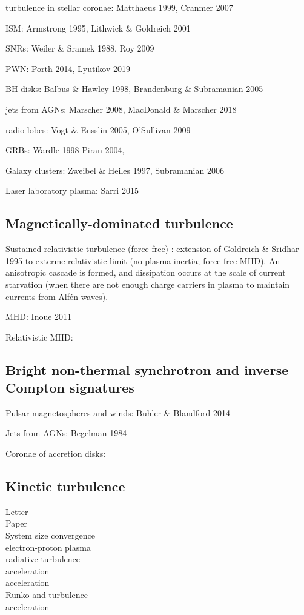 \documentclass[usenatbib,twocolumn]{aastex63}
\begin{document}
turbulence in stellar coronae:
Matthaeus 1999, Cranmer 2007

ISM:
Armstrong 1995, Lithwick \& Goldreich 2001

SNRs:
Weiler \& Sramek 1988, Roy 2009

PWN:
Porth 2014, Lyutikov 2019

BH disks:
Balbus \& Hawley 1998, Brandenburg \& Subramanian 2005

jets from AGNs:
Marscher 2008, MacDonald \& Marscher 2018
\citep{MacDonald_2018}

radio lobes:
Vogt \& Ensslin 2005, O'Sullivan 2009

GRBs:
Wardle 1998
Piran 2004, 
\citep{Kumar_2009}

Galaxy clusters:
Zweibel \& Heiles 1997, Subramanian 2006

Laser laboratory plasma:
Sarri 2015


\subsection{Magnetically-dominated turbulence}

Sustained relativistic turbulence (force-free)
\citep{Thompson_1998}: extension of Goldreich \& Sridhar 1995 to exterme relativistic limit (no plasma inertia; force-free MHD).
An anisotropic cascade is formed, and dissipation occurs at the scale of current starvation (when there are not enough charge carriers in plasma to maintain currents from Alf\'en waves).

MHD:
\citep{Cho_2005}
Inoue 2011
\citep{Cho_2014}
\citep{Zrake_2016}

Relativistic MHD:
\citep{Zrake_2012}
\citep{Zrake_2014}

\subsection{Bright non-thermal synchrotron and inverse Compton signatures}
Pulsar magnetospheres and winds:
Buhler \& Blandford 2014

Jets from AGNs: Begelman 1984

Coronae of accretion disks:
\citep{Yuan_2014}


\subsection{Kinetic turbulence}

\citep{Zhdankin_2017a} Letter\\
\citep{Zhdankin_2017b} Paper\\
\citep{Zhdankin_2018} System size convergence\\
\citep{Zhdankin_2019a} electron-proton plasma\\
\citep{Zhdankin_2019b} radiative turbulence\\
\citep{Comisso_2018} acceleration\\
\citep{Wong_2019} acceleration\\
\citep{Nattila_2019} Runko and turbulence\\
\citep{Comisso_2019} acceleration\\
\end{document}
